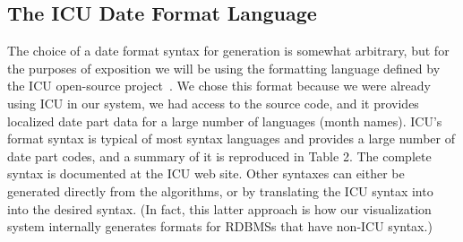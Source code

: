 \subsection{The ICU Date Format Language}

The choice of a date format syntax for generation is somewhat arbitrary, but for the purposes of exposition we will be using the formatting language defined by the ICU open-source project~\cite{ICU}. We chose this format because we were already using ICU in our system, we had access to the source code, and it provides localized date part data for a large number of languages (\eg month names). ICU's format syntax is typical of most syntax languages and provides a large number of date part codes, and a summary of it is reproduced in Table 2. The complete syntax is documented at the ICU web site.  Other syntaxes can either be generated directly from the algorithms, or by translating the ICU syntax into into the desired syntax. (In fact, this latter approach is how our visualization system internally generates formats for RDBMSs that have non-ICU syntax.)
